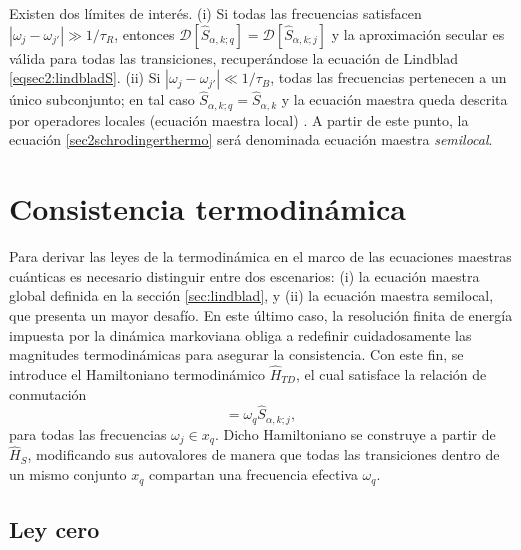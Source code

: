 Existen dos límites de interés. (i) Si todas las frecuencias satisfacen 
\(|\omega_{j}-\omega_{j'}|\gg 1/\tau_{R}\),
entonces \(\mathcal{D}[\hat{S}_{\alpha,k;q}]=\mathcal{D}[\hat{S}_{\alpha,k;j}]\) y la aproximación secular es válida para todas las transiciones, recuperándose la ecuación de Lindblad \eqref{eqsec2:lindbladS}. (ii) Si 
\(|\omega_{j}-\omega_{j'}|\ll 1/\tau_{B}\),
todas las frecuencias pertenecen a un único subconjunto; en tal caso \(\hat{S}_{\alpha,k;q}=\hat{S}_{\alpha,k}\) y la ecuación maestra queda descrita por operadores locales (ecuación maestra local) \cite{wichterich2007modeling}. A partir de este punto, la ecuación \eqref{sec2schrodingerthermo} será denominada ecuación maestra \textit{semilocal}.



\section{Consistencia termodinámica}
\label{sec2:thermolaws}

Para derivar las leyes de la termodinámica en el marco de las ecuaciones maestras cuánticas es necesario distinguir entre dos escenarios: 
(i) la ecuación maestra global definida en la sección \ref{sec:lindblad}, y 
(ii) la ecuación maestra semilocal, que presenta un mayor desafío. 
En este último caso, la resolución finita de energía impuesta por la dinámica markoviana obliga a redefinir cuidadosamente las magnitudes termodinámicas para asegurar la consistencia. 
Con este fin, se introduce el Hamiltoniano termodinámico $\hat{H}_{TD}$, el cual satisface la relación de conmutación
\begin{equation*}
    [\hat{S}_{\alpha,k;j},\hat{H}_{TD}] = \omega_{q}\hat{S}_{\alpha,k;j},
\end{equation*}
para todas las frecuencias $\omega_{j} \in x_{q}$. 
Dicho Hamiltoniano se construye a partir de $\hat{H}_{S}$, modificando sus autovalores de manera que todas las transiciones dentro de un mismo conjunto $x_q$ compartan una frecuencia efectiva $\omega_{q}$.

\subsection*{Ley cero}

